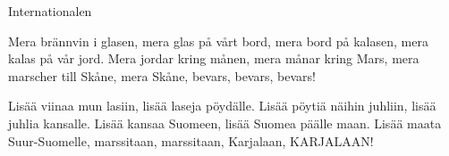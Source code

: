 \begin{song}{Internationalen}

	Mera brännvin i glasen,
	mera glas på vårt bord,
	mera bord på kalasen,
	mera kalas på vår jord.
	Mera jordar kring månen,
	mera månar kring Mars,
	mera marscher till Skåne,
	mera Skåne, bevars, bevars, bevars!

	Lisää viinaa mun lasiin,
	lisää laseja pöydälle.
	Lisää pöytiä näihin juhliin,
	lisää juhlia kansalle.
	Lisää kansaa Suomeen,
	lisää Suomea päälle maan.
	Lisää maata Suur-Suomelle,
	marssitaan, marssitaan, Karjalaan,
	KARJALAAN!

\end{song}

